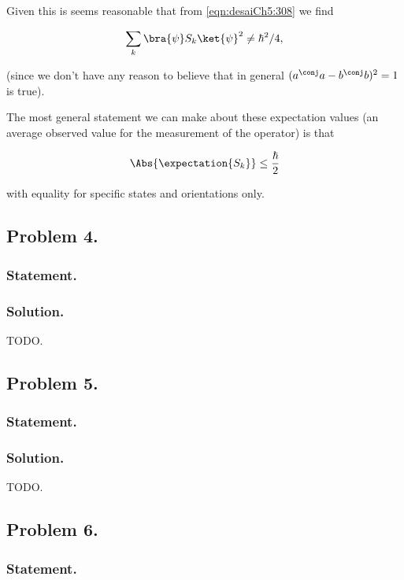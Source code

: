 Given this is seems reasonable that from \ref{eqn:desaiCh5:308} we find

\begin{align}\label{eqn:desaiCh5:311}
\sum_k {\bra{\psi} S_k \ket{\psi}}^2 \ne \hbar^2/4,
\end{align}

(since we don't have any reason to believe that in general $( a^\conj a - b^\conj b )^2 = 1$ is true).

The most general statement we can make about these expectation values (an average observed value for the measurement of the operator) is that

\begin{align}\label{eqn:desaiCh5:312}
\Abs{\expectation{S_k}} \le \frac{\hbar}{2} 
\end{align}

with equality for specific states and orientations only.

\subsection{Problem 4.}
\subsubsection{Statement.}
\subsubsection{Solution.}

TODO.

\subsection{Problem 5.}
\subsubsection{Statement.}
\subsubsection{Solution.}

TODO.

\subsection{Problem 6.}
\subsubsection{Statement.}

